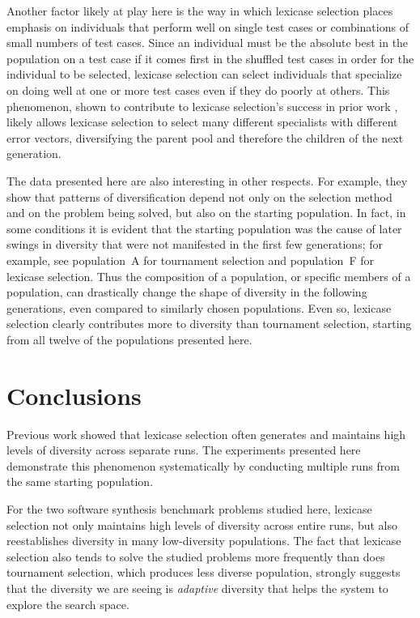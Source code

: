 \documentclass{sig-alternate-05-2015}
\begin{document}
Another factor likely at play here is the way in which lexicase selection places emphasis on individuals that perform well on single test cases or combinations of small numbers of test cases. Since an individual must be the absolute best in the population on a test case if it comes first in the shuffled test cases in order for the individual to be selected, lexicase selection can select individuals that specialize on doing well at one or more test cases even if they do poorly at others. This phenomenon, shown to contribute to lexicase selection's success in prior work \cite{Helmuth:2015:dissertation}, likely allows lexicase selection to select many different specialists with different error vectors, diversifying the parent pool and therefore the children of the next generation.

The data presented here are also interesting in other respects. For example, they show that patterns of diversification depend not only on the selection method and on the problem being solved, but also on the starting population. In fact, in some conditions it is evident that the starting population was the cause of later swings in diversity that were not manifested in the first few generations; for example, see population~A for tournament selection and population~F for lexicase selection. Thus the composition of a population, or specific members of a population, can drastically change the shape of diversity in the following generations, even compared to similarly chosen populations. Even so, lexicase selection clearly contributes more to diversity than tournament selection, starting from all twelve of the populations presented here.


\section{Conclusions}
\label{sec:conclusions}

Previous work showed that lexicase selection often generates and maintains high levels of diversity across separate runs. The experiments presented here demonstrate this phenomenon systematically by conducting multiple runs from the same starting population.

For the two software synthesis benchmark problems studied here, lexicase selection not only maintains high levels of diversity across entire runs, but also reestablishes diversity in many low-diversity populations. The fact that lexicase selection also tends to solve the studied problems more frequently than does tournament selection, which produces less diverse population, strongly suggests that the diversity we are seeing is {\it adaptive} diversity that helps the system to explore the search space.
\end{document}
